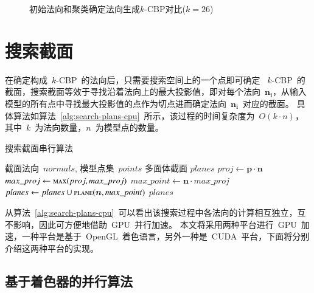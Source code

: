\begin{figure}[htbp]
\setcounter{subfigure}{0}
  \centering
  \hspace{3em}%
  \hspace{3em}%
  \caption{初始法向和聚类确定法向生成$k$-CBP对比($k=26$)}
  \label{lbl:kemans-fixed-kcbp}
\end{figure}

\section{搜索截面}
\label{sec:search:planes}

在确定构成~$k$-CBP~的法向后，只需要搜索空间上的一个点即可确定
~$k$-CBP~的截面，搜索截面等效于寻找沿着法向上的最大投影值，即对每个法向~$\bm{n_i}$，从输入模型的所有点中寻找最大投影值的点作为切点进而确定法向~$\bm{n_i}$~对应的截面。
具体算法如算法~\ref{alg:search-plans-cpu}~所示，该过程的时间复杂度为~$O(k\cdot
n)$， 其中~$k$~为法向数量，$n$~为模型点的数量。

\begin{algorithm}[htbp]
\small
\caption{搜索截面串行算法}
\label{alg:search-plans-cpu}
\begin{algorithmic}[1]
\Require
截面法向~$normals$, 模型点集~$points$
\Ensure
多面体截面 $planes$
          \State $proj \gets  \bm{p} \cdot \bm{n}$ 
          \State $max\_proj \gets \Call{max}{proj, max\_proj}$ 
      \EndFor
  \EndFor
      \State $max\_point \gets \bm{n} \cdot max\_proj$ 
      \State $planes\gets planes \cup \Call{plane}{\bm{n}, max\_point}$ 
  \EndFor
  \State \Return $planes$
\EndFunction
\end{algorithmic}
\end{algorithm}

从算法~\ref{alg:search-plans-cpu}~可以看出该搜索过程中各法向的计算相互独立，互不影响，因此可方便地借助~GPU~并行加速。
本文将采用两种平台进行~GPU~加速，一种平台是基于~OpenGL~着色语言，另外一种是~CUDA~平台，下面将分别介绍这两种平台的实现。

\subsection{基于着色器的并行算法}
\label{subsec:determ-normals-by-shader}

